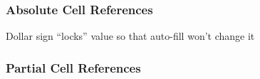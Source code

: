 \documentclass[color=usenames,dvipsnames]{beamer}
\begin{document}
\begin{frame}
  \frametitle{Absolute Cell References}
  \begin{center}
    Dollar sign ``locks'' value so that auto-fill won't change it
  \end{center}
\end{frame}


\begin{frame}
  \frametitle{Partial Cell References}
\end{frame}
\end{document}
